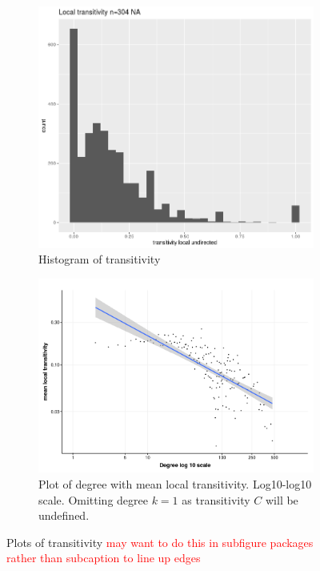     
\begin{figure}
    \centering
    \begin{subfigure}[t]{0.45\textwidth}
        \centering
        \includegraphics[width=\linewidth]{images/Rplot_transitivity.png} 
        \caption{Histogram of transitivity} \label{fig:transitivity}
    \end{subfigure}
    \hfill
    \begin{subfigure}[t]{0.45\textwidth}
        \centering
        \includegraphics[width=\linewidth]{images/chapter3/ggplot2/c(k)/Rplot_C_k_new_formatted.png}
        \caption{Plot of degree with mean local transitivity. Log10-log10 scale. Omitting degree $k=1$ as transitivity $C$ will be undefined.} \label{fig:log_transitivity_degree}
    \end{subfigure}
    \caption{Plots of transitivity \textcolor{red}{may want to do this in subfigure packages rather than subcaption to line up edges}}
\end{figure}

